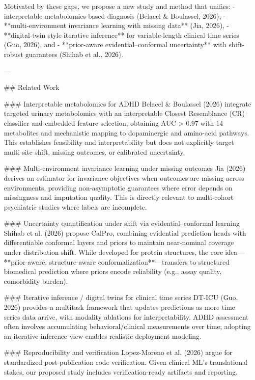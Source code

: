 Motivated by these gaps, we propose a new study and method that unifies:  
- interpretable metabolomics-based diagnosis (Belacel & Boulassel, 2026),  
- **multi-environment invariance learning with missing data** (Jia, 2026),  
- **digital-twin style iterative inference** for variable-length clinical time series (Guo, 2026), and  
- **prior-aware evidential–conformal uncertainty** with shift-robust guarantees (Shihab et al., 2026).

---

## Related Work  

### Interpretable metabolomics for ADHD  
Belacel & Boulassel (2026) integrate targeted urinary metabolomics with an interpretable Closest Resemblance (CR) classifier and embedded feature selection, obtaining AUC > 0.97 with 14 metabolites and mechanistic mapping to dopaminergic and amino-acid pathways. This establishes feasibility and interpretability but does not explicitly target multi-site shift, missing outcomes, or calibrated uncertainty.

### Multi-environment invariance learning under missing outcomes  
Jia (2026) derives an estimator for invariance objectives when outcomes are missing across environments, providing non-asymptotic guarantees where error depends on missingness and imputation quality. This is directly relevant to multi-cohort psychiatric studies where labels are incomplete.

### Uncertainty quantification under shift via evidential–conformal learning  
Shihab et al. (2026) propose CalPro, combining evidential prediction heads with differentiable conformal layers and priors to maintain near-nominal coverage under distribution shift. While developed for protein structures, the core idea—**prior-aware, structure-aware conformalization**—transfers to structured biomedical prediction where priors encode reliability (e.g., assay quality, comorbidity burden).

### Iterative inference / digital twins for clinical time series  
DT-ICU (Guo, 2026) provides a multitask framework that updates predictions as more time series data arrive, with modality ablations for interpretability. ADHD assessment often involves accumulating behavioral/clinical measurements over time; adopting an iterative inference view enables realistic deployment modeling.

### Reproducibility and verification  
Lopez-Moreno et al. (2026) argue for standardized post-publication code verification. Given clinical ML’s translational stakes, our proposed study includes verification-ready artifacts and reporting.

